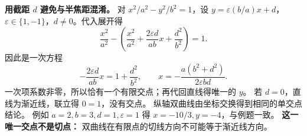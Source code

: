 \begin{proofbox}
\textbf{用截距 $d$ 避免与半焦距混淆。}
对 $x^2/a^2-y^2/b^2=1$，设 $y=\varepsilon(b/a)x+d$，
$\varepsilon\in\{1,-1\}$，$d\ne0$。代入展开得
\[
\frac{x^2}{a^2}-\left(\frac{x^2}{a^2}
+\frac{2\varepsilon d}{ab}x+\frac{d^2}{b^2}\right)=1.
\]
因此是一次方程
\[
-\frac{2\varepsilon d}{ab}x=1+\frac{d^2}{b^2},\qquad
\boxed{x=-\frac{a(b^2+d^2)}{2\varepsilon b d}}.
\]
一次项系数非零，所以恰有一个有限交点；再代回直线得唯一的 $y$。
若 $d=0$，直线为渐近线，联立得 $0=1$，没有交点。
纵轴双曲线由坐标交换得到相同的单交点结论。
例如 $a=2,b=3,d=1,\varepsilon=1$ 得 $x=-10/3,y=-4$，与例题一致。
\textbf{这一唯一交点不是切点：} 双曲线在有限点的切线方向不可能等于渐近线方向。
\end{proofbox}
